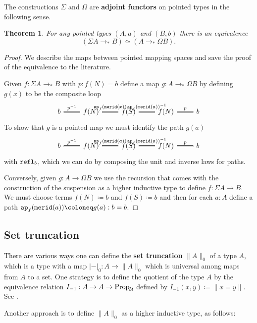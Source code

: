\documentclass{amsart}
\theoremstyle{theorem}
\newtheorem*{thm}{Theorem}
\theoremstyle{definition}
\theoremstyle{remark}
\newcommand{\0}{\mathbbe{0}}
\newcommand{\1}{\mathbbe{1}}
\newcommand{\2}{\mathbbe{2}}
\newcommand{\3}{\mathbbe{3}}
\newcommand{\4}{\mathbbe{4}}
\newcommand{\term}[1]{{\textup{\texttt{#1}}}}
\newcommand{\type}[1]{{\textup{#1}}}
\newcommand{\refl}{\term{refl}}
\newcommand{\ap}{\term{ap}}
\newcommand{\UU}{{\mathcal{U}}}
\newcommand{\Prop}{\type{Prop}_{\UU}}
\newcommand{\mere}[1]{\|{#1}\|}
\newcommand{\set}[1]{\|{#1}\|_0}
\begin{document}
The constructions $\Sigma$ and $\Omega$ are \textbf{adjoint functors} on pointed types in the following sense.

\begin{thm} For any pointed types $(A,a)$ and $(B,b)$ there is an equivalence
\[ (\Sigma A \to_* B) \simeq (A \to_* \Omega B).\]
\end{thm}
\begin{proof}
We describe the maps between pointed mapping spaces and save the proof of the equivalence to the literature.

Given $f : \Sigma A \to_* B$ with $p : f(N) = b$ define a map $g : A \to_* \Omega B$ by defining $g(x)$ to be the composite loop
\[
\begin{tikzcd} b \arrow[r, equals, "p^{-1}"] & f(N) \arrow[r, equals, "\ap_f(\term{merid}(x))"] & f(S) \arrow[r, equals, "\ap_f(\term{merid}(a))^{-1}"] & f(N) \arrow[r, "p", equals] & b
\end{tikzcd}
\]
To show that $g$ is a pointed map we must identify the path $g(a)$
\[
\begin{tikzcd} b \arrow[r, equals, "p^{-1}"] & f(N) \arrow[r, equals, "\ap_f(\term{merid}(a))"] & f(S) \arrow[r, equals, "\ap_f(\term{merid}(a))^{-1}"] & f(N) \arrow[r, "p", equals] & b
\end{tikzcd}
\]
with $\refl_b$, which we can do by composing the unit and inverse laws for paths.

Conversely, given $g : A \to \Omega B$ we use the recursion that comes with the construction of the suspension as a higher inductive type to define $f : \Sigma A \to B$. We must choose terms $f(N) \coloneq b$ and $f(S) \coloneq b$ and then for each $a :A$ define a path $\ap_f(\term{merid}(a)) \coloneq g(a) : b = b$.
\end{proof}

\subsection*{Set truncation}

There are various ways one can define the \textbf{set truncation} $\set{A}$ of a type $A$, which is a type with a map $|-|_0 \colon A \to \set{A}$ which is universal among maps from $A$ to a set. One strategy is to define the quotient of the type $A$ by the equivalence relation $I_{-1} : A \to A \to \Prop$ defined by $I_{-1}(x,y) \coloneq \mere{ x= y}$. See \cite[27.3]{Rijke}.

Another approach is to define $\set{A}$ as a higher inductive type, as follows:
\end{document}
